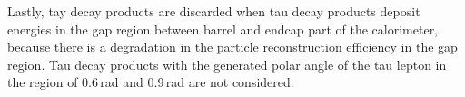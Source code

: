 Lastly, tay decay products are discarded when tau decay products deposit energies in the gap region between barrel and  endcap part of the calorimeter, because there is a degradation in the particle reconstruction efficiency in the gap region. Tau decay products with the generated polar angle of the tau lepton in the region of 0.6\,rad and 0.9\,rad are not considered.













